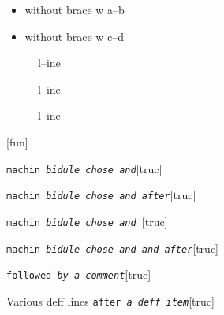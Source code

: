\documentclass{book}
\begin{document}
\begin{itemize}[label={}]
\item without brace w a--b
\item without brace w c--d
\end{itemize}

\begin{description}
\item[{\parbox[b]{\linewidth}{%
a}}]
l--ine
\end{description}

\begin{description}
\item[{\parbox[b]{\linewidth}{%
a--missing style formatting}}]
l--ine
\end{description}

\begin{description}
\item[{\parbox[b]{\linewidth}{%
a\\
\index[fn]{a@\texttt{a}}%
\index[cp]{index entry between item and itemx}%
b
\index[fn]{b@\texttt{b}}%
}}]
l--ine
\end{description}

\noindent\texttt{}\hfill[fun]



\noindent\texttt{machin \EmbracOn{}\textnormal{\textsl{bidule chose and}}\EmbracOff{}}\hfill[truc]



%
\noindent\texttt{machin \EmbracOn{}\textnormal{\textsl{bidule chose and  after}}\EmbracOff{}}\hfill[truc]



%
\noindent\texttt{machin \EmbracOn{}\textnormal{\textsl{bidule chose and }}\EmbracOff{}}\hfill[truc]



%
\noindent\texttt{machin \EmbracOn{}\textnormal{\textsl{bidule chose and and after}}\EmbracOff{}}\hfill[truc]



%
\noindent\texttt{followed \EmbracOn{}\textnormal{\textsl{by a comment}}\EmbracOff{}}\hfill[truc]



%
Various deff lines
\noindent\texttt{after \EmbracOn{}\textnormal{\textsl{a deff item}}\EmbracOff{}}\hfill[truc]
\end{document}
